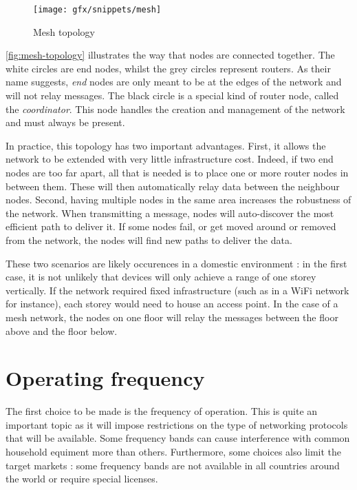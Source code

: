 \begin{figure}[htb]
  \begin{center}
    \texttt{[image: gfx/snippets/mesh]}
  \end{center}
  \caption{Mesh topology\citep{hunn2010}}
  \label{fig:mesh-topology}
\end{figure}

\autoref{fig:mesh-topology} illustrates the way that nodes are connected
together. The white circles are end nodes, whilst the grey circles represent
routers. As their name suggests, \emph{end} nodes are only meant to be at the
edges of the network and will not relay messages. The black circle is a special
kind of router node, called the \emph{coordinator}. This node handles the
creation and management of the network and must always be present.

In practice, this topology has two important advantages. First, it allows the
network to be extended with very little infrastructure cost. Indeed, if two end
nodes are too far apart, all that is needed is to place one or more router nodes
in between them. These will then automatically relay data between the neighbour
nodes. Second, having multiple nodes in the same area increases the robustness
of the network. When transmitting a message, nodes will auto-discover the most
efficient path to deliver it. If some nodes fail, or get moved around or removed
from the network, the nodes will find new paths to deliver the data. 


These two scenarios are likely occurences in a domestic environment : in the
first case, it is not unlikely that devices will only achieve a range of one
storey vertically. If the network required fixed infrastructure (such as in
a WiFi network for instance), each storey would need to house an access point.
In the case of a mesh network, the nodes on one floor will relay the messages
between the floor above and the floor below. 



\section{Operating frequency}\label{sec:frequency}

The first choice to be made is the frequency of operation. This is quite an
important topic as it will impose restrictions on the type of networking
protocols that will be available. Some frequency bands can cause interference
with common household equiment more than others. Furthermore, some choices also
limit the target markets : some frequency bands are not available in all
countries around the world or require special licenses.

